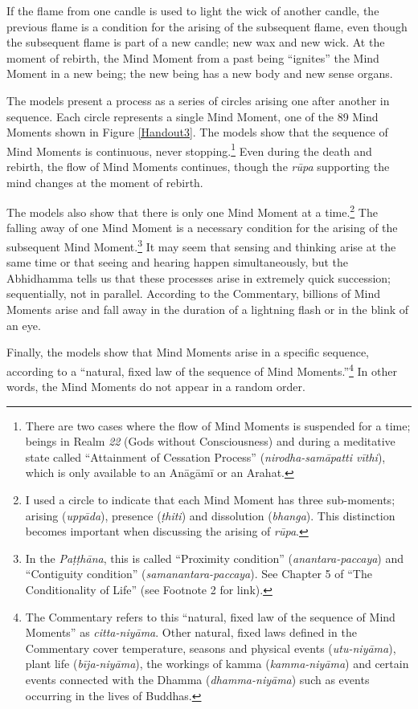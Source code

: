 \pagebreak

If the flame from one candle is used to light the wick of another candle, the previous flame is a condition for the arising of the subsequent flame, even though the subsequent flame is part of a new candle; new wax and new wick. At the moment of rebirth, the Mind Moment from a past being “ignites” the Mind Moment in a new being; the new being has a new body and new sense organs.

The models present a process as a series of circles arising one after another in sequence. Each circle represents a single Mind Moment, one of the 89 Mind Moments shown in Figure \ref{Handout3}. The models show that the sequence of Mind Moments is continuous, never stopping.\footnote{There are two cases where the flow of Mind Moments is suspended for a time; beings in Realm \textit{22} (Gods without Consciousness) and during a meditative state called “Attainment of Cessation Process” (\textit{nirodha-samāpatti vīthi}), which is only available to an Anāgāmī or an Arahat.} Even during the death and rebirth, the flow of Mind Moments continues, though the \textit{rūpa} supporting the mind changes at the moment of rebirth.

The models also show that there is only one Mind Moment at a time.\footnote{I used a circle to indicate that each Mind Moment has three sub-moments; arising (\textit{uppāda}), presence (\textit{ṭhiti}) and dissolution (\textit{bhanga}). This distinction becomes important when discussing the arising of \textit{rūpa}.} The falling away of one Mind Moment is a necessary condition for the arising of the subsequent Mind Moment.\footnote{In the \textit{Paṭṭhāna}, this is called “Proximity condition” (\textit{anantara-paccaya}) and “Contiguity condition” (\textit{samanantara-paccaya}). See Chapter 5 of “The Conditionality of Life” (see Footnote 2 for link).} It may seem that sensing and thinking arise at the same time or that seeing and hearing happen simultaneously, but the Abhidhamma tells us that these processes arise in extremely quick succession; sequentially, not in parallel. According to the Commentary, billions of Mind Moments arise and fall away in the duration of a lightning flash or in the blink of an eye.

Finally, the models show that Mind Moments arise in a specific sequence, according to a “natural, fixed law of the sequence of Mind Moments.”\footnote{The Commentary refers to this “natural, fixed law of the sequence of Mind Moments” as \textit{citta-niyāma}. Other natural, fixed
laws defined in the Commentary cover temperature, seasons and physical events (\textit{utu-niyāma}), plant life
(\textit{bīja-niyāma}), the workings of kamma (\textit{kamma-niyāma}) and certain events connected with the
Dhamma (\textit{dhamma-niyāma}) such as events occurring in the lives of Buddhas.} In other words, the Mind Moments do not appear in a random order.

